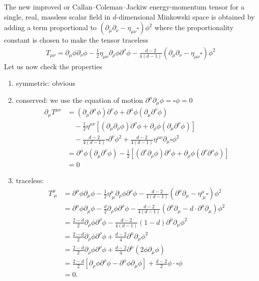 \documentclass[10pt,a4paper]{book}
\theoremstyle{definition}
\begin{document}
The new improved or Callan–Coleman–Jackiw energy-momentum tensor for a single, real, massless scalar field in $d$-dimensional Minkowski space is obtained by adding a term proportional to $(\partial_\mu\partial_\nu-\eta_{\mu\nu}\square)\phi^2$ where the proportionality constant is chosen to make the tensor traceless
\begin{align}
    T_{\mu\nu}=\partial_\mu\phi\partial_\nu\phi-\frac{1}{2}\eta_{\mu\nu}\partial_\rho\phi\partial^\rho\phi-\frac{d-2}{4(d-1)}\left(\partial_\mu\partial_\nu-\eta_{\mu\nu}\square\right)\phi^2
\end{align}
Let us now check the properties
\begin{enumerate}
    \item symmetric: obvious
    \item conserved: we use the equation of motion $\partial^\mu\partial_\mu\phi=\square\phi=0$
    \begin{align}
        \partial_\mu T^{\mu\nu}&=(\partial_\mu\partial^\mu\phi)\partial^\nu\phi+\partial^\mu\phi(\partial_\mu\partial^\nu\phi)\\
        &\quad-\frac{1}{2}\eta^{\mu\nu}\left[(\partial_\mu\partial_\rho\phi)\partial^\rho\phi + \partial_\rho\phi(\partial_\mu\partial^\rho\phi)\right]\\
        &\quad-\frac{d-2}{4(d-1)}\square\partial^\nu\phi^2+\frac{d-2}{4(d-1)}\eta^{\mu\nu}\partial_\mu\square\phi^2\\
        &=\partial^\mu\phi(\partial_\mu\partial^\nu\phi)-\frac{1}{2}\left[(\partial^\nu\partial_\rho\phi)\partial^\rho\phi + \partial_\rho\phi(\partial^\nu\partial^\rho\phi)\right]\\
        &=0
    \end{align}
    \item traceless: 
    \begin{align}
    T^\mu_{\;\mu}&=\partial^\mu\phi\partial_\mu\phi-\frac{1}{2}\eta^\mu_{\;\mu}\partial_\rho\phi\partial^\rho\phi-\frac{d-2}{4(d-1)}\left(\partial^\mu\partial_\mu-\eta^\mu_{\;\mu}\square\right)\phi^2\\
    &=\partial^\mu\phi\partial_\mu\phi-\frac{d}{2}\partial_\rho\phi\partial^\rho\phi-\frac{d-2}{4(d-1)}\left(\partial^\mu\partial_\mu-d\cdot\partial^\mu\partial_\mu\right)\phi^2\\
    &=\frac{2-d}{2}\partial_\rho\phi\partial^\rho\phi-\frac{d-2}{4(d-1)}(1-d)\partial^\mu\partial_\mu\phi^2\\
    &=\frac{2-d}{2}\partial_\rho\phi\partial^\rho\phi+\frac{d-2}{4}\partial^\mu\partial_\mu\phi^2\\
    &=\frac{2-d}{2}\partial_\rho\phi\partial^\rho\phi+\frac{d-2}{4}\partial^\mu(2\phi\partial_\mu\phi)\\
    &=\frac{2-d}{2}[\partial_\rho\phi\partial^\rho\phi-\partial^\mu\phi\partial_\mu\phi]+\frac{d-2}{2}\phi\cdot\square\phi\\
    &=0.
\end{align}
\end{enumerate}
\end{document}
